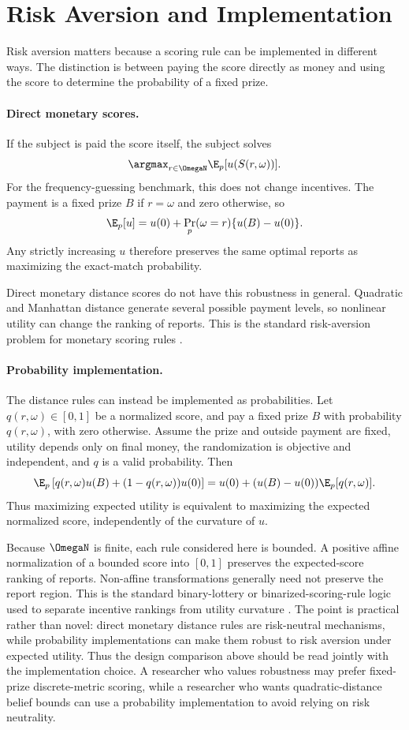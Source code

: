 \section{Risk Aversion and Implementation}

Risk aversion matters because a scoring rule can be implemented in different ways.
The distinction is between paying the score directly as money and using the score to determine the probability of a fixed prize.

\paragraph{Direct monetary scores.}
If the subject is paid the score itself, the subject solves
\[
\argmax_{r\in\OmegaN}\E_p[u(S(r,\omega))].
\]
For the frequency-guessing benchmark, this does not change incentives.
The payment is a fixed prize \(B\) if \(r=\omega\) and zero otherwise, so
\[
\E_p[u]
=
u(0)+\Pr_p(\omega=r)\{u(B)-u(0)\}.
\]
Any strictly increasing \(u\) therefore preserves the same optimal reports as maximizing the exact-match probability.

Direct monetary distance scores do not have this robustness in general.
Quadratic and Manhattan distance generate several possible payment levels, so nonlinear utility can change the ranking of reports.
This is the standard risk-aversion problem for monetary scoring rules \cite{ArmantierTreich2012,SchlagEtAl2013}.

\paragraph{Probability implementation.}
The distance rules can instead be implemented as probabilities.
Let \(q(r,\omega)\in[0,1]\) be a normalized score, and pay a fixed prize \(B\) with probability \(q(r,\omega)\), with zero otherwise.
Assume the prize and outside payment are fixed, utility depends only on final money, the randomization is objective and independent, and \(q\) is a valid probability.
Then
\[
\E_p\left[
q(r,\omega)u(B)+(1-q(r,\omega))u(0)
\right]
=
u(0)+(u(B)-u(0))\E_p[q(r,\omega)].
\]
Thus maximizing expected utility is equivalent to maximizing the expected normalized score, independently of the curvature of \(u\).

Because \(\OmegaN\) is finite, each rule considered here is bounded.
A positive affine normalization of a bounded score into \([0,1]\) preserves the expected-score ranking of reports.
Non-affine transformations generally need not preserve the report region.
This is the standard binary-lottery or binarized-scoring-rule logic used to separate incentive rankings from utility curvature \cite{ArmantierTreich2012,SchlagEtAl2013}.
The point is practical rather than novel: direct monetary distance rules are risk-neutral mechanisms, while probability implementations can make them robust to risk aversion under expected utility.
Thus the design comparison above should be read jointly with the implementation choice.
A researcher who values robustness may prefer fixed-prize discrete-metric scoring, while a researcher who wants quadratic-distance belief bounds can use a probability implementation to avoid relying on risk neutrality.
